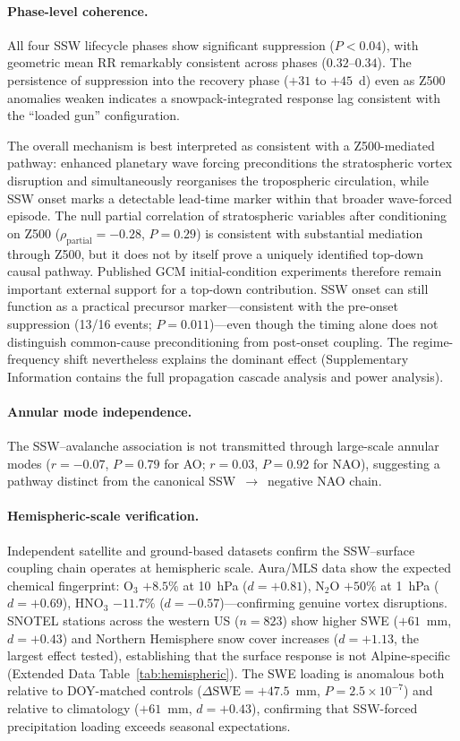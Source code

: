 \documentclass[11pt,letterpaper]{article}
\begin{document}
\paragraph{Phase-level coherence.} All four SSW lifecycle phases show significant suppression ($P < 0.04$), with geometric mean RR remarkably consistent across phases ($0.32$--$0.34$). The persistence of suppression into the recovery phase ($+31$ to $+45$~d) even as Z500 anomalies weaken indicates a snowpack-integrated response lag consistent with the ``loaded gun'' configuration.

The overall mechanism is best interpreted as consistent with a Z500-mediated pathway: enhanced planetary wave forcing preconditions the stratospheric vortex disruption and simultaneously reorganises the tropospheric circulation, while SSW onset marks a detectable lead-time marker within that broader wave-forced episode. The null partial correlation of stratospheric variables after conditioning on Z500 ($\rho_{\mathrm{partial}} = -0.28$, $P = 0.29$) is consistent with substantial mediation through Z500, but it does not by itself prove a uniquely identified top-down causal pathway. Published GCM initial-condition experiments therefore remain important external support for a top-down contribution\cite{Hitchcock2013,Baldwin2021}. SSW onset can still function as a practical precursor marker---consistent with the pre-onset suppression (13/16 events; $P = 0.011$)---even though the timing alone does not distinguish common-cause preconditioning from post-onset coupling. The regime-frequency shift nevertheless explains the dominant effect (Supplementary Information contains the full propagation cascade analysis and power analysis).

\paragraph{Annular mode independence.} The SSW--avalanche association is not transmitted through large-scale annular modes ($r = -0.07$, $P = 0.79$ for AO; $r = 0.03$, $P = 0.92$ for NAO), suggesting a pathway distinct from the canonical SSW~$\to$~negative NAO chain\cite{Baldwin2001,Kidston2015}.

\paragraph{Hemispheric-scale verification.} Independent satellite and ground-based datasets confirm the SSW--surface coupling chain operates at hemispheric scale. Aura/MLS data show the expected chemical fingerprint: O$_3$ $+8.5\%$ at 10~hPa ($d = +0.81$), N$_2$O $+50\%$ at 1~hPa ($d = +0.69$), HNO$_3$ $-11.7\%$ ($d = -0.57$)---confirming genuine vortex disruptions. SNOTEL stations across the western US ($n = 823$) show higher SWE ($+61$~mm, $d = +0.43$) and Northern Hemisphere snow cover increases ($d = +1.13$, the largest effect tested), establishing that the surface response is not Alpine-specific (Extended Data Table~\ref{tab:hemispheric}). The SWE loading is anomalous both relative to DOY-matched controls ($\Delta\mathrm{SWE} = +47.5$~mm, $P = 2.5 \times 10^{-7}$) and relative to climatology ($+61$~mm, $d = +0.43$), confirming that SSW-forced precipitation loading exceeds seasonal expectations.
\end{document}
